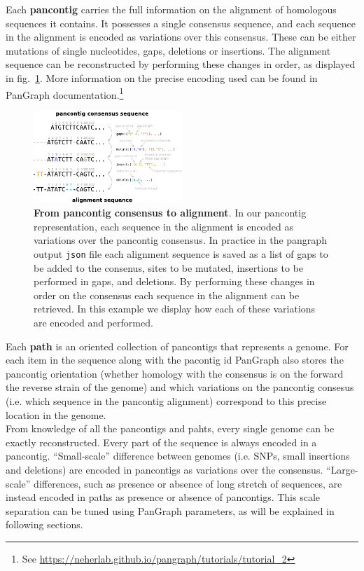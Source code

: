 \documentclass[aps,rmp,reprint,superscriptaddress,notitlepage,10pt,onecolumn]{revtex4-1}
\begin{document}
Each \textbf{pancontig} carries the full information on the alignment of homologous sequences it contains. It possesses a single consensus sequence, and each sequence in the alignment is encoded as variations over this consensus. These can be either mutations of single nucleotides, gaps, deletions or insertions. The alignment sequence can be reconstructed by performing these changes in order, as displayed in fig.~\ref{fig:alignment-reconstruction}. More information on the precise encoding used can be found in PanGraph documentation.\footnote{See \url{https://neherlab.github.io/pangraph/tutorials/tutorial_2}}\\

\begin{figure}[htb]
    \includegraphics[width=0.5\textwidth]{figs_suppl/pancontig_alignment.pdf}
    \caption{{\bf From pancontig consensus to alignment}. In our pancontig representation, each sequence in the alignment is encoded as variations over the pancontig consensus. In practice in the pangraph output \texttt{json} file each alignment sequence is saved as a list of gaps to be added to the consenus, sites to be mutated, insertions to be performed in gaps, and deletions. By performing these changes in order on the consensus each sequence in the alignment can be retrieved. In this example we display how each of these variations are encoded and performed.
    }
    \label{fig:alignment-reconstruction}
\end{figure}

Each \textbf{path} is an oriented collection of pancontigs that represents a genome. For each item in the sequence along with the pacontig id PanGraph also stores the pancontig orientation (whether homology with the consensus is on the forward the reverse strain of the genome) and which variations on the pancontig consesus (i.e. which sequence in the pancontig alignment) correspond to this precise location in the genome.\\

From knowledge of all the pancontigs and pahts, every single genome can be exactly reconstructed. Every part of the sequence is always encoded in a pancontig. ``Small-scale'' difference between genomes (i.e. SNPs, small insertions and deletions) are encoded in pancontigs as variations over the consensus. ``Large-scale'' differences, such as presence or absence of long stretch of sequences, are instead encoded in paths as presence or absence of pancontigs. This scale separation can be tuned using PanGraph parameters, as will be explained in following sections.
\end{document}
